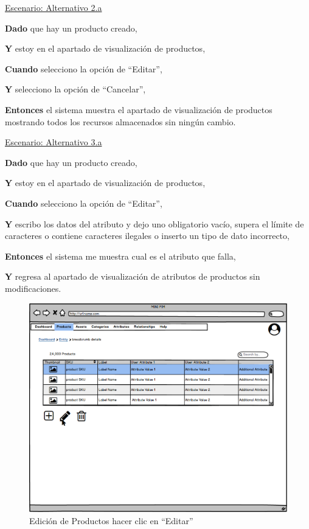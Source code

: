 \underline{Escenario: Alternativo 2.a}\par
\vspace{0.15cm}
\textbf{Dado} que hay un producto creado,\par
\textbf{Y} estoy en el apartado de visualización de productos,\par
\textbf{Cuando} selecciono la opción de \enquote{Editar},\par
\textbf{Y} selecciono la opción de \enquote{Cancelar},\par
\textbf{Entonces} el sistema muestra el apartado de visualización de productos mostrando todos los recursos almacenados sin ningún cambio.\par
\vspace{0.20cm}

\underline{Escenario: Alternativo 3.a}\par
\vspace{0.15cm}
\textbf{Dado} que hay un producto creado,\par
\textbf{Y} estoy en el apartado de visualización de productos,\par
\textbf{Cuando} selecciono la opción de \enquote{Editar},\par
\textbf{Y} escribo los datos del atributo y dejo uno obligatorio vacío, supera el límite de caracteres o contiene caracteres ilegales o inserto un tipo de dato incorrecto,\par
\textbf{Entonces} el sistema me muestra cual es el atributo que falla,\par
\textbf{Y} regresa al apartado de visualización de atributos de productos sin modificaciones.\par
\vspace{0.20cm}


\begin{figure}[H]
    \includegraphics[width=1\linewidth]{mockups/RF2-X Editar Producto Click en Lapiz.png}
    \caption{Edición de Productos hacer clic en \enquote{Editar}}
   \end{figure}
\vspace{1.0cm}


